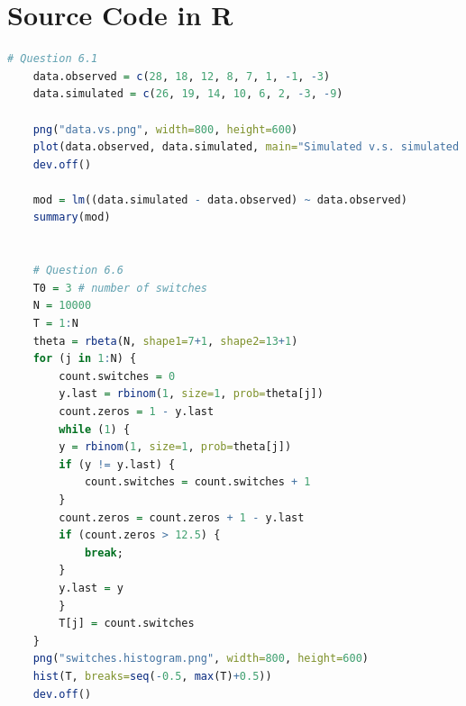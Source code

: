 \documentclass{article}
\begin{document}
\section*{Source Code in R}
{
    \begin{lstlisting}[language=R]
    # Question 6.1
    data.observed = c(28, 18, 12, 8, 7, 1, -1, -3)
    data.simulated = c(26, 19, 14, 10, 6, 2, -3, -9)
    
    png("data.vs.png", width=800, height=600)
    plot(data.observed, data.simulated, main="Simulated v.s. simulated order statistics")
    dev.off()
    
    mod = lm((data.simulated - data.observed) ~ data.observed)
    summary(mod)
    
    
    # Question 6.6
    T0 = 3 # number of switches
    N = 10000
    T = 1:N
    theta = rbeta(N, shape1=7+1, shape2=13+1)
    for (j in 1:N) {
        count.switches = 0
        y.last = rbinom(1, size=1, prob=theta[j])
        count.zeros = 1 - y.last
        while (1) {
        y = rbinom(1, size=1, prob=theta[j])
        if (y != y.last) {
            count.switches = count.switches + 1
        }
        count.zeros = count.zeros + 1 - y.last
        if (count.zeros > 12.5) {
            break;
        }
        y.last = y
        }
        T[j] = count.switches
    }
    png("switches.histogram.png", width=800, height=600)
    hist(T, breaks=seq(-0.5, max(T)+0.5))
    dev.off()
    \end{lstlisting}
}

\clearpage
\end{document}

